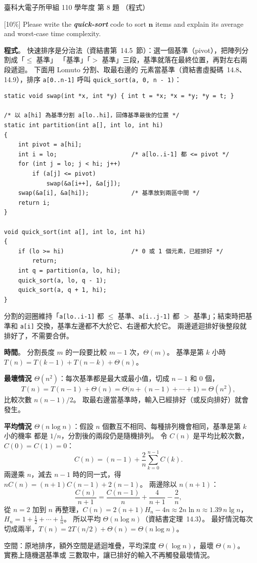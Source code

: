 \begin{pastexam}[label={px:ntust-110-ete-ds-08}]{臺科大電子所甲組 110 學年度 第 8 題}
（程式）

{[}10\%{]} Please write the \textbf{\textit{quick-sort}} code to sort $\boldsymbol{n}$ items and explain its
average and worst-case time complexity.
\end{pastexam}

\begin{pastsoln}
\textbf{程式}。 快速排序是分治法（資結書第~14.5~節）：選一個基準（pivot），把陣列分割成「$\le$ 基準」
「基準」「$>$ 基準」三段，基準就落在最終位置，再對左右兩段遞迴。 下面用 Lomuto 分割、取最右邊的
元素當基準（資結書虛擬碼~14.8、14.9），排序 \texttt{a[0..n-1]} 呼叫 \texttt{quick\_sort(a, 0, n - 1)}：
\begin{verbatim}
static void swap(int *x, int *y) { int t = *x; *x = *y; *y = t; }

/* 以 a[hi] 為基準分割 a[lo..hi]，回傳基準最後的位置 */
static int partition(int a[], int lo, int hi)
{
    int pivot = a[hi];
    int i = lo;                     /* a[lo..i-1] 都 <= pivot */
    for (int j = lo; j < hi; j++)
        if (a[j] <= pivot)
            swap(&a[i++], &a[j]);
    swap(&a[i], &a[hi]);            /* 基準放到兩區中間 */
    return i;
}

void quick_sort(int a[], int lo, int hi)
{
    if (lo >= hi)                   /* 0 或 1 個元素，已經排好 */
        return;
    int q = partition(a, lo, hi);
    quick_sort(a, lo, q - 1);
    quick_sort(a, q + 1, hi);
}
\end{verbatim}
分割的迴圈維持「\texttt{a[lo..i-1]} 都 $\le$ 基準、\texttt{a[i..j-1]} 都 $>$ 基準」；結束時把基準和
\texttt{a[i]} 交換，基準左邊都不大於它、右邊都大於它。 兩邊遞迴排好後整段就排好了，不需要合併。

\textbf{時間}。 分割長度 $m$ 的一段要比較 $m - 1$ 次，$\Theta(m)$。 基準是第 $k$ 小時
$T(n) = T(k - 1) + T(n - k) + \Theta(n)$。

\textbf{最壞情況 $\Theta(n^2)$}：每次基準都是最大或最小值，切成 $n - 1$ 和 $0$ 個，
\[
T(n) = T(n - 1) + \Theta(n) = \Theta\bigl(n + (n - 1) + \cdots + 1\bigr) = \Theta(n^2),
\]
比較次數 $n(n - 1)/2$。 取最右邊當基準時，輸入已經排好（或反向排好）就會發生。

\textbf{平均情況 $\Theta(n \log n)$}：假設 $n$ 個數互不相同、每種排列機會相同，基準是第 $k$ 小的機率
都是 $1/n$，分割後的兩段仍是隨機排列。 令 $C(n)$ 是平均比較次數，$C(0) = C(1) = 0$：
\[
C(n) = (n - 1) + \frac{2}{n}\sum_{k=0}^{n-1} C(k).
\]
兩邊乘 $n$，減去 $n - 1$ 時的同一式，得 $nC(n) = (n + 1)C(n - 1) + 2(n - 1)$。 兩邊除以
$n(n + 1)$：
\[
\frac{C(n)}{n + 1} = \frac{C(n - 1)}{n} + \frac{4}{n + 1} - \frac{2}{n},
\]
從 $n = 2$ 加到 $n$ 再整理，$C(n) = 2(n + 1)H_n - 4n \approx 2n \ln n \approx 1.39\,n \lg n$，
$H_n = 1 + \frac12 + \cdots + \frac1n$。 所以平均 $\Theta(n \log n)$（資結書定理~14.3）。 最好情況每次
切成兩半，$T(n) = 2T(n/2) + \Theta(n) = \Theta(n \log n)$。

空間：原地排序，額外空間是遞迴堆疊，平均深度 $\Theta(\log n)$，最壞 $\Theta(n)$。 實務上隨機選基準或
三數取中，讓已排好的輸入不再觸發最壞情況。
\end{pastsoln}
